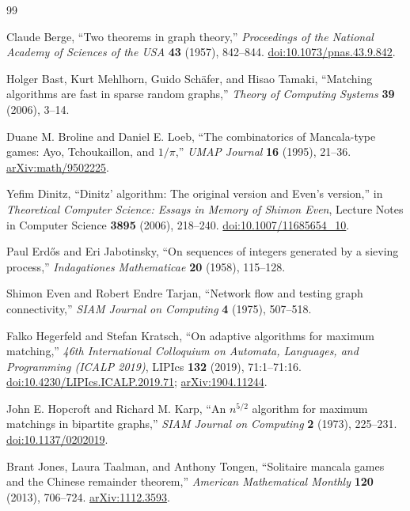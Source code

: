 \begin{thebibliography}{99}
\small

Claude Berge, ``Two theorems in graph theory,'' \emph{Proceedings of the
National Academy of Sciences of the USA} \textbf{43} (1957), 842--844.
\href{https://doi.org/10.1073/pnas.43.9.842}{doi:10.1073/pnas.43.9.842}.

Holger Bast, Kurt Mehlhorn, Guido Schäfer, and Hisao Tamaki, ``Matching
algorithms are fast in sparse random graphs,'' \emph{Theory of Computing
Systems} \textbf{39} (2006), 3--14.

Duane M. Broline and Daniel E. Loeb, ``The combinatorics of Mancala-type
games: Ayo, Tchoukaillon, and $1/\pi$,'' \emph{UMAP Journal} \textbf{16}
(1995), 21--36. \href{https://arxiv.org/abs/math/9502225}{arXiv:math/9502225}.

Yefim Dinitz, ``Dinitz' algorithm: The original version and Even's
version,'' in \emph{Theoretical Computer Science: Essays in Memory of Shimon
Even}, Lecture Notes in Computer Science \textbf{3895} (2006), 218--240.
\href{https://doi.org/10.1007/11685654_10}{doi:10.1007/11685654\_10}.

Paul Erdős and Eri Jabotinsky, ``On sequences of integers generated by a
sieving process,'' \emph{Indagationes Mathematicae} \textbf{20} (1958),
115--128.

Shimon Even and Robert Endre Tarjan, ``Network flow and testing graph
connectivity,'' \emph{SIAM Journal on Computing} \textbf{4} (1975), 507--518.

Falko Hegerfeld and Stefan Kratsch, ``On adaptive algorithms for maximum
matching,'' \emph{46th International Colloquium on Automata, Languages, and
Programming (ICALP 2019)}, LIPIcs \textbf{132} (2019), 71:1--71:16.
\href{https://doi.org/10.4230/LIPIcs.ICALP.2019.71}{doi:10.4230/LIPIcs.ICALP.2019.71};
\href{https://arxiv.org/abs/1904.11244}{arXiv:1904.11244}.

John E. Hopcroft and Richard M. Karp, ``An $n^{5/2}$ algorithm for maximum
matchings in bipartite graphs,'' \emph{SIAM Journal on Computing} \textbf{2}
(1973), 225--231.
\href{https://doi.org/10.1137/0202019}{doi:10.1137/0202019}.

Brant Jones, Laura Taalman, and Anthony Tongen, ``Solitaire mancala games and
the Chinese remainder theorem,'' \emph{American Mathematical Monthly}
\textbf{120} (2013), 706--724.
\href{https://arxiv.org/abs/1112.3593}{arXiv:1112.3593}.


\end{thebibliography}
